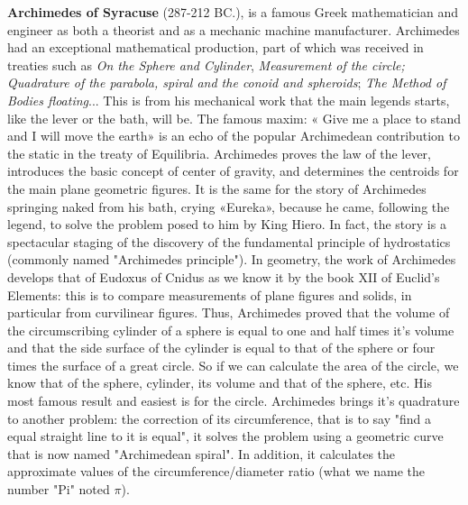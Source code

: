 \pichskip{15pt}%
\textbf{Archimedes of Syracuse} (287-212 BC.), is a famous Greek mathematician and engineer as both a theorist and as a mechanic machine manufacturer. Archimedes had an exceptional mathematical production, part of which was received in treaties such as \textit{On the Sphere and Cylinder}, \textit{Measurement of the circle; Quadrature of the parabola, spiral and the conoid and spheroids}; \textit{The Method of Bodies floating}... This is from his mechanical work that the main legends starts, like the lever or the bath, will be. The famous maxim: « Give me a place to stand and I will move the earth» is an echo of the popular Archimedean contribution to the static in the treaty of Equilibria. Archimedes proves the law of the lever, introduces the basic concept of center of gravity, and determines the centroids for the main plane geometric figures. It is the same for the story of Archimedes springing naked from his bath, crying  «Eureka», because he came, following the legend, to solve the problem posed to him by King Hiero. In fact, the story is a spectacular staging of the discovery of the fundamental principle of hydrostatics (commonly named "Archimedes principle"). In geometry, the work of Archimedes develops that of Eudoxus of Cnidus as we know it by the book XII of Euclid's Elements: this is to compare measurements of plane figures and solids, in particular from curvilinear figures. Thus, Archimedes proved that the volume of the circumscribing cylinder of a sphere is equal to one and half times it's volume and that the side surface of the cylinder is equal to that of the sphere or four times the surface of a great circle. So if we can calculate the area of the circle, we know that of the sphere, cylinder, its volume and that of the sphere, etc. His most famous result and easiest is for the circle. Archimedes brings it's quadrature to another problem: the correction of its circumference, that is to say "find a equal straight line to it is equal", it solves the problem using a geometric curve that is now named "Archimedean spiral". In addition, it calculates the approximate values of the circumference/diameter ratio (what we name the number "Pi" noted $\pi$).

